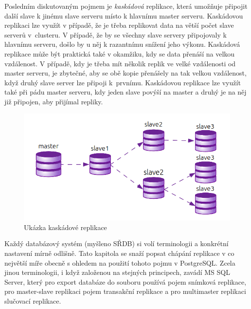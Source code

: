 Posledním diskutovaným pojmem je {\it kaskádová} replikace, která umožňuje připojit další slave k jinému slave serveru místo k hlavnímu master serveru. Kaskádovou replikaci lze využít v případě, že je třeba replikovat data na větší počet slave serverů v~clusteru. V případě, že by se všechny slave servery připojovaly k hlavnímu serveru, došlo by u něj k razantnímu snížení jeho výkonu. Kaskádová replikace může být praktická také v okamžiku, kdy se data přenáší na velkou vzdálenost. V případě, kdy je třeba mít několik replik ve velké vzdálenosti od master serveru, je zbytečné, aby se obě kopie přenášely na tak velkou vzdálenost, když druhý slave server lze připoji k~prvnímu. Kaskádovou replikace lze využít také při pádu master serveru, kdy jeden slave povýší na master a druhý je na něj již připojen, aby přijímal repliky.

          \begin{figure}[H]
            \centering
            \includegraphics[scale=1]{../../../grafy/obr/schema_kaskadova.png}
            \caption{Ukázka kaskádové replikace}
            \label{kaskadova}
          \end{figure}

Každý  databázový systém (myšleno SŘDB) si volí terminologii a konkrétní nas\-ta\-ve\-ní mírně odlišně. Tato kapitola se snaží popsat chápání replikace v co největší míře obecně s ohledem na použití tohoto pojmu v PostgreSQL. Zcela jinou terminologii, i když založenou na stejných principech, zavádí MS SQL Server, který pro export databáze do souboru používá pojem snímková replikace, pro master-slave replikaci pojem transakční replikace a pro multimaster replikaci slučovací replikace. 



